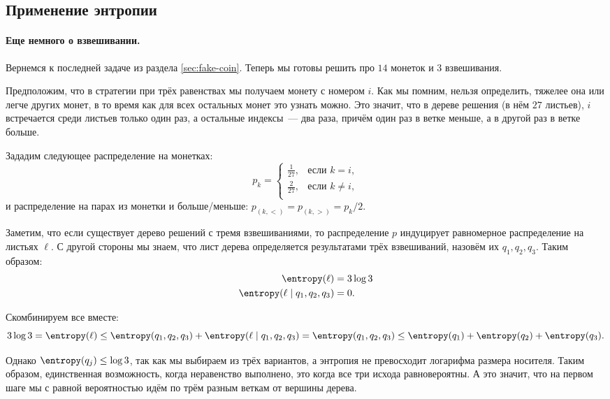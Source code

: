\subsection{Применение энтропии}

\paragraph{Еще немного о взвешивании.} Вернемся к последней задаче из раздела \ref{sec:fake-coin}. Теперь
мы готовы решить про $14$ монеток и $3$ взвешивания.

Предположим, что в стратегии при трёх равенствах мы получаем монету с номером $i$. Как мы помним, нельзя
определить, тяжелее она или легче других монет, в то время как для всех остальных монет это узнать
можно. Это значит, что в дереве решения (в нём $27$ листьев), $i$ встречается среди листьев только один
раз, а остальные индексы~--- два раза, причём один раз в ветке меньше, а в другой раз в ветке больше.

Зададим следующее распределение на монетках:
$$
    p_k =
    \begin{cases}
        \frac{1}{27}, &\text{если } k = i,\\
        \frac{2}{27}, &\text{если } k \ne i,\\
    \end{cases}
$$    
и распределение на парах из монетки и больше/меньше: $ p_{(k, <)} = p_{(k, >)} = p_k / 2$.

Заметим, что если существует дерево решений с тремя взвешиваниями, то распределение $p$ индуцирует
равномерное распределение на листьях $\ell$. С другой стороны мы знаем, что лист дерева определяется  
результатами трёх взвешиваний, назовём их $q_1, q_2, q_3$. Таким образом:
\begin{align*}
  \entropy(\ell) &= 3 \log 3\\
  \entropy(\ell \mid q_1, q_2, q_3) &= 0.
\end{align*}

Скомбинируем все вместе:
$$
    3\log 3 = \entropy(\ell) \le \entropy(q_1, q_2, q_3) +\entropy(\ell \mid q_1, q_2, q_3) =
    \entropy(q_1, q_2, q_3) \le \entropy(q_1) + \entropy(q_2) + \entropy(q_3).
$$
    
Однако $\entropy(q_j) \le \log 3$, так как мы выбираем из трёх вариантов, а энтропия не превосходит
логарифма размера носителя. Таким образом, единственная возможность, когда неравенство выполнено, это
когда все три исхода равновероятны. А это значит, что на первом шаге мы с равной вероятностью идём по
трём разным веткам от вершины дерева.

